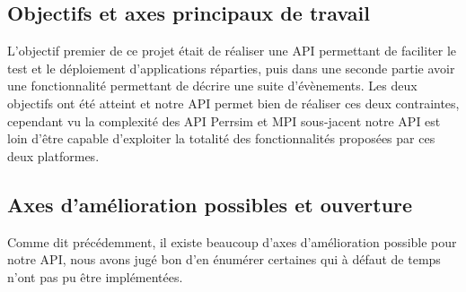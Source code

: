 \documentclass{article}
\begin{document}
			\subsection{Objectifs et axes principaux de travail}
			L'objectif premier de ce projet était de réaliser une API permettant de faciliter le test et le déploiement d'applications réparties, puis dans une seconde partie avoir une 
			fonctionnalité permettant de décrire une suite d'évènements. 
			\newline
			Les deux objectifs ont été atteint et notre API permet bien de réaliser ces deux contraintes,
			cependant vu la complexité des API Perrsim et MPI sous-jacent notre API est loin d'être capable d'exploiter la totalité des fonctionnalités proposées par ces deux platformes.
			\subsection{Axes d'amélioration possibles et ouverture}
			Comme dit précédemment, il existe beaucoup d'axes d'amélioration possible pour notre API, nous avons jugé bon d'en énumérer certaines qui à défaut de temps n'ont pas pu être implémentées.
\end{document}
